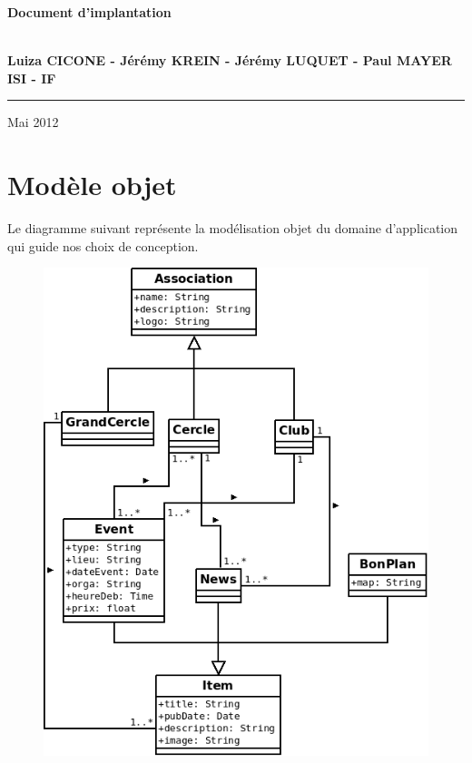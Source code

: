 \documentclass[a4paper, 11px]{article}
\begin{document}
\begin{titlepage}
\begin{center}
\begin{center}
{\Huge \bf Document d'implantation}


\end{center}


\vspace{1cm}

\begin{center}
$ $\\
\large{ \textbf{Luiza CICONE - Jérémy KREIN - Jérémy LUQUET - Paul MAYER}}\\
\large{ \textbf{ISI - IF}}
$ $\\
\end{center}
\rule{\linewidth}{.5pt}


\vfill


{\large Mai 2012}

\end{center}
\end{titlepage}

\tableofcontents

\newpage

\section{Modèle objet}
Le diagramme suivant représente la modélisation objet du domaine d'application qui guide nos choix de conception.

\begin{figure}[h!]
\begin{center}
\includegraphics[scale=0.5]{classes.png}
\end{center}
\end{figure}
\end{document}
